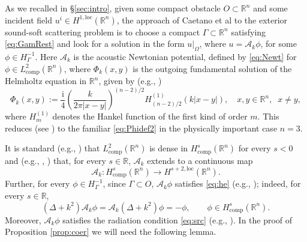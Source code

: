 \documentclass{birkjour}
\theoremstyle{definition}
\theoremstyle{remark}
\numberwithin{equation}{section}
\newcommand{\R}{\mathbb{R}}
\newcommand{\Hol}{H^{1,\mathrm{loc}}}
\newcommand{\Lcomp}{L^{2}_{\mathrm{comp}}}
\newcommand{\ri}{\mathrm{i}}
\newcommand{\cA}{\mathcal{A}}
\begin{document}
As we recalled in \S\ref{sec:intro}, given some compact obstacle $O\subset \R^n$ and some incident field $u^i\in \Hol(\R^n)$, the approach of Caetano et al \cite{caetano2025integral} to the exterior sound-soft scattering problem is to choose a compact $\Gamma\subset \R^n$ satisfying \eqref{eq:GamRest} and look for a solution in the form $u|_\Omega$, where $u=\cA_k \phi$, for some $\phi\in H^{-1}_\Gamma$. Here $\cA_k$ is the acoustic Newtonian potential, defined by  \eqref{eq:Newt} for $\phi\in \Lcomp(\R^n)$, where $\Phi_k(x,y)$ is the outgoing fundamental solution of the Helmholtz equation in $\R^n$, given by 
(e.g., \cite[Eqn.~(9.14)]{mclean2000strongly})
\begin{equation} \label{eq:Phidef}
\Phi_k(x,y) := \frac{\ri}{4}\left(\frac{k}{2\pi |x-y|}\right)^{(n-2)/2}H_{(n-2)/2}^{(1)}(k|x-y|), \quad x,y\in \R^n, \;\; x\neq y,
\end{equation} 
where $H_m^{(1)}$ denotes the Hankel function of the first kind of order $m$. This reduces (see \cite[Eqn.~10.16.2]{NIST}) to the familiar \eqref{eq:Phidef2} in the physically important case $n=3$.


 It is standard (e.g., \cite[Lem.~3.24]{mclean2000strongly}) that $\Lcomp(\R^n)$ is dense in $H^{s}_{\mathrm{comp}}(\R^n)$ for every $s<0$ and (e.g., \cite[Thm.~3.1.2]{SaSc:11}, \cite[Thm.~6.1]{mclean2000strongly}) that, for every $s\in \R$, $\cA_k$ extends to a continuous map  
\begin{equation} \label{eq:mapping}
\cA_k:H^{s}_{\mathrm{comp}}(\R^n) \to H^{s+2,\mathrm{loc}}(\R^n).
\end{equation}  
Further, for every $\phi\in H^{-1}_\Gamma$, since $\Gamma \subset O$, $\cA_k\phi$ satisfies \eqref{eq:he} (e.g., \cite[Eqns.~(6.2), (9.14)]{mclean2000strongly}); indeed, for every $s\in \R$,
\begin{equation} \label{eq:inv}
(\Delta  + k^2)\cA_k\phi = \cA_k(\Delta  + k^2)\phi = -\phi, \qquad \phi\in H^s_{\mathrm{comp}}(\R^n).
\end{equation}
Moreover, $\cA_k\phi$ satisfies the radiation condition \eqref{eq:src} (e.g.,  \cite[Lem.~7.14, Thm.~9.6]{mclean2000strongly}).  In the proof of Proposition \ref{prop:coer} we will need the following lemma.
\end{document}
